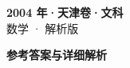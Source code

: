 \documentclass[zihao=-4, a4paper]{ctexart}
\begin{document}
\begin{center}
  {\Large\bfseries 2004 年·天津卷·文科}\\[4pt]
  {\large 数学 · 解析版}
\end{center}
\medskip
{}

\clearpage
{}
\begin{center}{\Large\bfseries 参考答案与详细解析}\end{center}
\medskip

\end{document}

